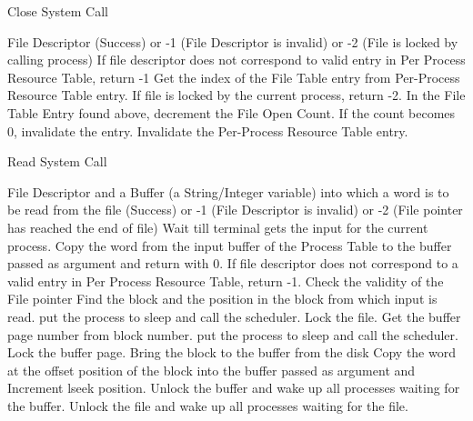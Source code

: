 
\begin{algorithm}
\caption{Close System Call}
\begin{algorithmic}
\REQUIRE File Descriptor
 (Success) or -1 (File Descriptor is invalid) or -2 (File is locked by calling process)
\STATE If file descriptor does not correspond to valid entry in Per Process Resource Table, return -1   
\STATE Get the index of the File Table entry from Per-Process Resource Table entry.
\STATE If file is locked by the current process, return -2.   
\STATE In the File Table Entry found above, decrement the File Open Count. If the count becomes 0, invalidate the entry.  
\STATE Invalidate the Per-Process Resource Table entry.    
\end{algorithmic}
\end{algorithm}


\begin{algorithm}
\caption{Read System Call}
\begin{algorithmic}
\REQUIRE File Descriptor and a Buffer (a String/Integer variable) into which a word is to be read from the file
 (Success) or -1 (File Descriptor is invalid) or -2 (File pointer has reached the end of file)
    \STATE Wait till terminal gets the input for the current process.
    \STATE Copy the word from the input buffer of the Process Table to the buffer passed as argument and return with 0. 
\ENDIF
\STATE If file descriptor does not correspond to a valid entry in Per Process Resource Table, return -1.
\STATE Check the validity of the File pointer
\STATE Find the block and the position in the block from which input is read.
    \STATE put the process to sleep and call the scheduler.
\ENDWHILE
\STATE Lock the file.
\STATE Get the buffer page number from block number.
    \STATE put the process to sleep and call the scheduler.
\ENDWHILE 
\STATE Lock the buffer page.
    \STATE Bring the block to the buffer from the disk
\ENDIF 
\STATE Copy the word at the offset position of the block into the buffer passed as argument and Increment lseek position.
\STATE Unlock the buffer and wake up all processes waiting for the buffer.
\STATE Unlock the file and wake up all processes waiting for the file.
\end{algorithmic}
\end{algorithm}

